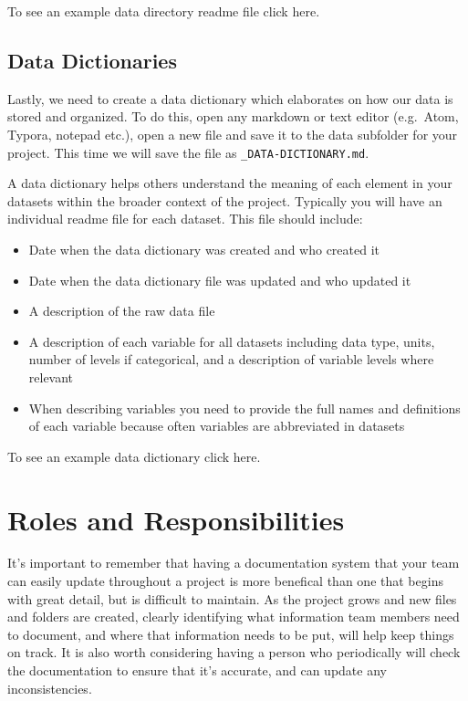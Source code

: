 \documentclass[
]{book}
\providecommand{\tightlist}{%
  \setlength{\itemsep}{0pt}\setlength{\parskip}{0pt}}
\begin{document}
To see an example data directory readme file click here.

\hypertarget{data-dictionaries}{%
\subsection*{Data Dictionaries}\label{data-dictionaries}}

Lastly, we need to create a data dictionary which elaborates on how our data is stored and organized. To do this, open any markdown or text editor (e.g.~Atom, Typora, notepad etc.), open a new file and save it to the data subfolder for your project. This time we will save the file as \texttt{\_DATA-DICTIONARY.md}.

A data dictionary helps others understand the meaning of each element in your datasets within the broader context of the project. Typically you will have an individual readme file for each dataset. This file should include:

\begin{itemize}
\tightlist
\item
  Date when the data dictionary was created and who created it
\item
  Date when the data dictionary file was updated and who updated it
\item
  A description of the raw data file
\item
  A description of each variable for all datasets including data type, units, number of levels if categorical, and a description of variable levels where relevant
\item
  When describing variables you need to provide the full names and definitions of each variable because often variables are abbreviated in datasets
\end{itemize}

To see an example data dictionary click here.

\hypertarget{roles-and-responsibilities-3}{%
\section*{Roles and Responsibilities}\label{roles-and-responsibilities-3}}

It's important to remember that having a documentation system that your team can easily update throughout a project is more benefical than one that begins with great detail, but is difficult to maintain. As the project grows and new files and folders are created, clearly identifying what information team members need to document, and where that information needs to be put, will help keep things on track. It is also worth considering having a person who periodically will check the documentation to ensure that it's accurate, and can update any inconsistencies.
\end{document}
